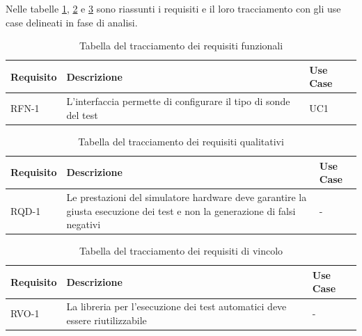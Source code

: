 Nelle tabelle \ref{tab:requisiti-funzionali}, \ref{tab:requisiti-qualitativi} e \ref{tab:requisiti-vincolo} sono riassunti i requisiti e il loro tracciamento con gli use case delineati in fase di analisi.

\newpage

\begin{table}%
\caption{Tabella del tracciamento dei requisiti funzionali}
\label{tab:requisiti-funzionali}
\begin{tabularx}{\textwidth}{lXl}
\hline\hline
\textbf{Requisito} & \textbf{Descrizione} & \textbf{Use Case}\\
\hline
RFN-1     & L'interfaccia permette di configurare il tipo di sonde del test & UC1 \\
\hline
\end{tabularx}
\end{table}%

\begin{table}%
\caption{Tabella del tracciamento dei requisiti qualitativi}
\label{tab:requisiti-qualitativi}
\begin{tabularx}{\textwidth}{lXl}
\hline\hline
\textbf{Requisito} & \textbf{Descrizione} & \textbf{Use Case}\\
\hline
RQD-1    & Le prestazioni del simulatore hardware deve garantire la giusta esecuzione dei test e non la generazione di falsi negativi & - \\
\hline
\end{tabularx}
\end{table}%

\begin{table}%
\caption{Tabella del tracciamento dei requisiti di vincolo}
\label{tab:requisiti-vincolo}
\begin{tabularx}{\textwidth}{lXl}
\hline\hline
\textbf{Requisito} & \textbf{Descrizione} & \textbf{Use Case}\\
\hline
RVO-1    & La libreria per l'esecuzione dei test automatici deve essere riutilizzabile & - \\
\hline
\end{tabularx}
\end{table}%
